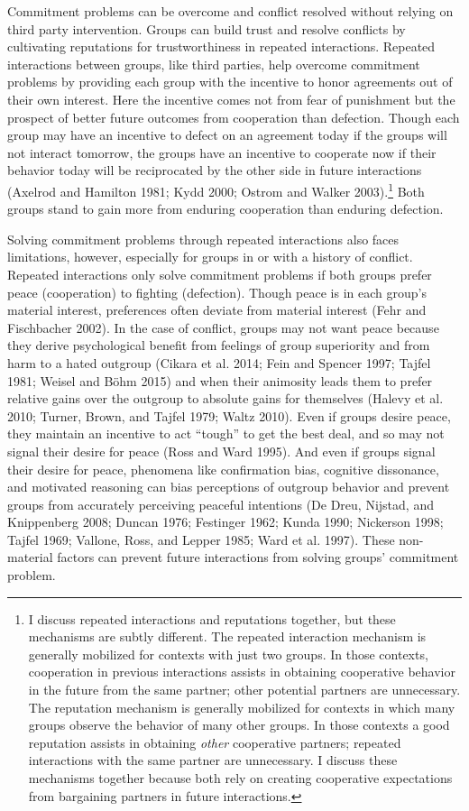 \documentclass[11pt]{article}
\begin{document}
Commitment problems can be overcome and conflict resolved without
relying on third party intervention. Groups can build trust and resolve
conflicts by cultivating reputations for trustworthiness in repeated
interactions. Repeated interactions between groups, like third parties,
help overcome commitment problems by providing each group with the
incentive to honor agreements out of their own interest. Here the
incentive comes not from fear of punishment but the prospect of better
future outcomes from cooperation than defection. Though each group may
have an incentive to defect on an agreement today if the groups will not
interact tomorrow, the groups have an incentive to cooperate now if
their behavior today will be reciprocated by the other side in future
interactions (Axelrod and Hamilton 1981; Kydd 2000; Ostrom and Walker
2003).\footnote{I discuss repeated interactions and reputations
  together, but these mechanisms are subtly different. The repeated
  interaction mechanism is generally mobilized for contexts with just
  two groups. In those contexts, cooperation in previous interactions
  assists in obtaining cooperative behavior in the future from the same
  partner; other potential partners are unnecessary. The reputation
  mechanism is generally mobilized for contexts in which many groups
  observe the behavior of many other groups. In those contexts a good
  reputation assists in obtaining \emph{other} cooperative partners;
  repeated interactions with the same partner are unnecessary. I discuss
  these mechanisms together because both rely on creating cooperative
  expectations from bargaining partners in future interactions.} Both
groups stand to gain more from enduring cooperation than enduring
defection.

Solving commitment problems through repeated interactions also faces
limitations, however, especially for groups in or with a history of
conflict. Repeated interactions only solve commitment problems if both
groups prefer peace (cooperation) to fighting (defection). Though peace
is in each group's material interest, preferences often deviate from
material interest (Fehr and Fischbacher 2002). In the case of conflict,
groups may not want peace because they derive psychological benefit from
feelings of group superiority and from harm to a hated outgroup (Cikara
et al. 2014; Fein and Spencer 1997; Tajfel 1981; Weisel and Böhm 2015)
and when their animosity leads them to prefer relative gains over the
outgroup to absolute gains for themselves (Halevy et al. 2010; Turner,
Brown, and Tajfel 1979; Waltz 2010). Even if groups desire peace, they
maintain an incentive to act ``tough'' to get the best deal, and so may
not signal their desire for peace (Ross and Ward 1995). And even if
groups signal their desire for peace, phenomena like confirmation bias,
cognitive dissonance, and motivated reasoning can bias perceptions of
outgroup behavior and prevent groups from accurately perceiving peaceful
intentions (De Dreu, Nijstad, and Knippenberg 2008; Duncan 1976;
Festinger 1962; Kunda 1990; Nickerson 1998; Tajfel 1969; Vallone, Ross,
and Lepper 1985; Ward et al. 1997). These non-material factors can
prevent future interactions from solving groups' commitment problem.
\end{document}
